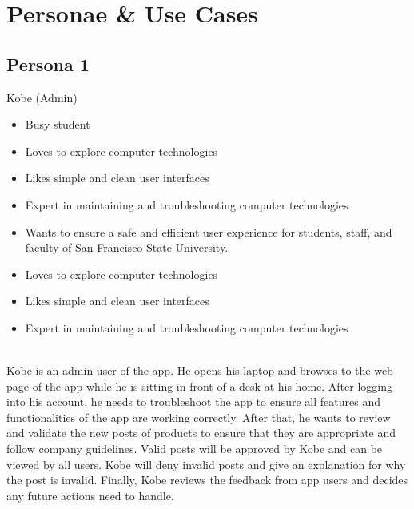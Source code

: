\section{Personae \& Use Cases}
\subsection{Persona 1}
\begin{description}[font=\bfseries\itshape]
\item[Actor:]Kobe (Admin)
\item[About:]\hfill
\begin{itemize}[leftmargin=0mm]
\item Busy student
\item Loves to explore computer technologies
\item Likes simple and clean user interfaces
\item Expert in maintaining and troubleshooting computer technologies
\end{itemize}
\item[Goals \& Scenario:]\hfill
\begin{itemize}[leftmargin=0mm]
\item Wants to ensure a safe and efficient user experience for students, staff, and faculty of San Francisco State University.
\item Loves to explore computer technologies
\item Likes simple and clean user interfaces
\item Expert in maintaining and troubleshooting computer technologies
\end{itemize}
\item[Use Case:]\hfill\\
Kobe is an admin user of the app. He opens his laptop and browses to the web page of the app while he is sitting in front of a desk at his home. After logging into his account, he needs to troubleshoot the app to ensure all features and functionalities of the app are working correctly. After that, he wants to review and validate the new posts of products to ensure that they are appropriate and follow company guidelines. Valid posts will be approved by Kobe and can be viewed by all users. Kobe will deny invalid posts and give an explanation for why the post is invalid. Finally, Kobe reviews the feedback from app users and decides any future actions need to handle.
\end{description}

